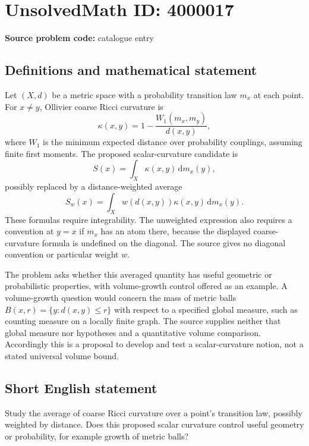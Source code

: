 \documentclass[11pt]{article}
\begin{document}
\section*{UnsolvedMath ID: 4000017}
\textbf{Source problem code:} catalogue entry
\subsection{Definitions and mathematical statement}
Let $(X,d)$ be a metric space with a probability transition law $m_x$ at each point. For $x\ne y$, Ollivier coarse Ricci curvature is
\[
\kappa(x,y)=1-\frac{W_1(m_x,m_y)}{d(x,y)},
\]
where $W_1$ is the minimum expected distance over probability couplings, assuming finite first moments. The proposed scalar-curvature candidate is
\[
S(x)=\int_X\kappa(x,y)\,\mathrm{d}m_x(y),
\]
possibly replaced by a distance-weighted average
\[
S_w(x)=\int_X w(d(x,y))\kappa(x,y)\,\mathrm{d}m_x(y).
\]
These formulas require integrability. The unweighted expression also requires a convention at $y=x$ if $m_x$ has an atom there, because the displayed coarse-curvature formula is undefined on the diagonal. The source gives no diagonal convention or particular weight $w$.

The problem asks whether this averaged quantity has useful geometric or probabilistic properties, with volume-growth control offered as an example. A volume-growth question would concern the mass of metric balls $B(x,r)=\{y:d(x,y)\leq r\}$ with respect to a specified global measure, such as counting measure on a locally finite graph. The source supplies neither that global measure nor hypotheses and a quantitative volume comparison. Accordingly this is a proposal to develop and test a scalar-curvature notion, not a stated universal volume bound.
\subsection{Short English statement}
Study the average of coarse Ricci curvature over a point's transition law, possibly weighted by distance. Does this proposed scalar curvature control useful geometry or probability, for example growth of metric balls?
\end{document}
